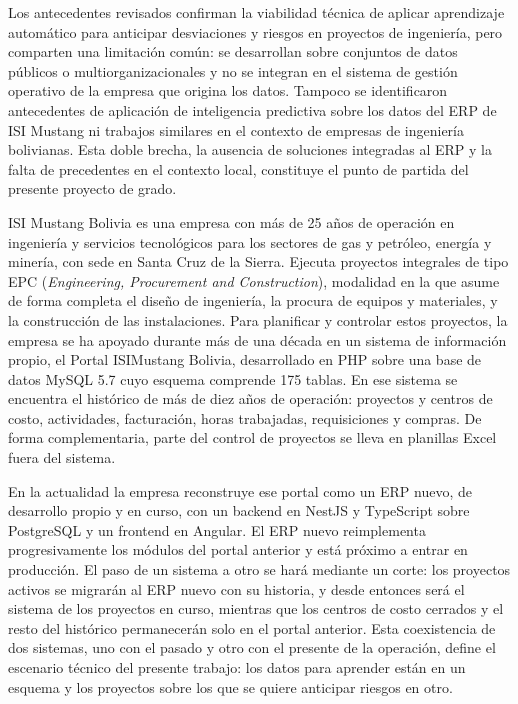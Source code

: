 Los antecedentes revisados confirman la viabilidad técnica de aplicar aprendizaje automático para anticipar desviaciones y riesgos en proyectos de ingeniería, pero comparten una limitación común: se desarrollan sobre conjuntos de datos públicos o multiorganizacionales y no se integran en el sistema de gestión operativo de la empresa que origina los datos. Tampoco se identificaron antecedentes de aplicación de inteligencia predictiva sobre los datos del ERP de ISI Mustang ni trabajos similares en el contexto de empresas de ingeniería bolivianas. Esta doble brecha, la ausencia de soluciones integradas al ERP y la falta de precedentes en el contexto local, constituye el punto de partida del presente proyecto de grado.

ISI Mustang Bolivia es una empresa con más de 25 años de operación en ingeniería y servicios tecnológicos para los sectores de gas y petróleo, energía y minería, con sede en Santa Cruz de la Sierra. Ejecuta proyectos integrales de tipo EPC (\textit{Engineering, Procurement and Construction}), modalidad en la que asume de forma completa el diseño de ingeniería, la procura de equipos y materiales, y la construcción de las instalaciones. Para planificar y controlar estos proyectos, la empresa se ha apoyado durante más de una década en un sistema de información propio, el Portal ISIMustang Bolivia, desarrollado en PHP sobre una base de datos MySQL 5.7 cuyo esquema comprende 175 tablas. En ese sistema se encuentra el histórico de más de diez años de operación: proyectos y centros de costo, actividades, facturación, horas trabajadas, requisiciones y compras. De forma complementaria, parte del control de proyectos se lleva en planillas Excel fuera del sistema.

En la actualidad la empresa reconstruye ese portal como un ERP nuevo, de desarrollo propio y en curso, con un backend en NestJS y TypeScript sobre PostgreSQL y un frontend en Angular. El ERP nuevo reimplementa progresivamente los módulos del portal anterior y está próximo a entrar en producción. El paso de un sistema a otro se hará mediante un corte: los proyectos activos se migrarán al ERP nuevo con su historia, y desde entonces será el sistema de los proyectos en curso, mientras que los centros de costo cerrados y el resto del histórico permanecerán solo en el portal anterior. Esta coexistencia de dos sistemas, uno con el pasado y otro con el presente de la operación, define el escenario técnico del presente trabajo: los datos para aprender están en un esquema y los proyectos sobre los que se quiere anticipar riesgos en otro.

